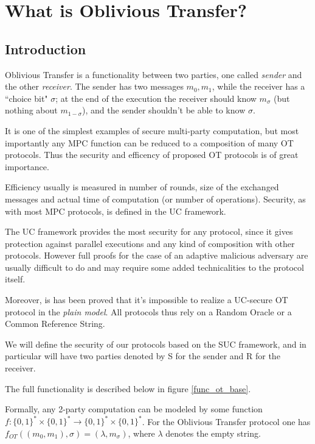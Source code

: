\chapter{What is Oblivious Transfer?}

\section{Introduction}
Oblivious Transfer is a functionality between two parties, one called \emph{sender} and the other \emph{receiver}. The sender has two messages $m_0,m_1$, while the receiver has a ``choice bit" $\sigma$; at the end of the execution the receiver should know $m_\sigma$ (but nothing about $m_{1-\sigma}$), and the sender shouldn't be able to know $\sigma$.

It is one of the simplest examples of secure multi-party computation, but most importantly any MPC function can be reduced to a composition of many OT protocols. Thus the security and efficency of proposed OT protocols is of great importance.

Efficiency usually is measured in number of rounds, size of the exchanged messages and actual time of computation (or number of operations). Security, as with most MPC protocols, is defined in the UC framework.

The UC framework provides the most security for any protocol, since it gives protection against parallel executions and any kind of composition with other protocols. However full proofs for the case of an adaptive malicious adversary are usually difficult to do and may require some added technicalities to the protocol itself.

Moreover, is has been proved that it's impossible to realize a UC-secure OT protocol in the \emph{plain model}. All protocols thus rely on a Random Oracle or a Common Reference String.

We will define the security of our protocols based on the SUC framework, and in particular will have two parties denoted by S for the sender and R for the receiver.

The full functionality is described below in figure \ref{func_ot_base}.

Formally, any 2-party computation can be modeled by some function $f:\{0,1\}^\ast\times\{0,1\}^\ast\to\{0,1\}^\ast\times\{0,1\}^\ast$. For the Oblivious Transfer protocol one has $f_{OT}((m_0,m_1), \sigma)=(\lambda, m_\sigma)$, where $\lambda$ denotes the empty string.

